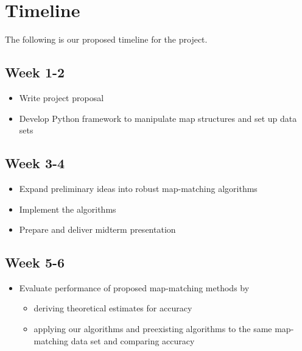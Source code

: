 \documentclass{article}
\numberwithin{equation}{section}
\theoremstyle{definition}
\begin{document}
\section{Timeline}
The following is our proposed timeline for the project. 

\subsection*{Week 1-2}
\begin{itemize}[noitemsep]
    \item Write project proposal
    \item Develop Python framework to manipulate map structures and set up data sets
\end{itemize}


\subsection*{Week 3-4}
\begin{itemize}[noitemsep]
    \item Expand preliminary ideas into robust map-matching algorithms
    \item Implement the algorithms
     \item Prepare and deliver midterm presentation
\end{itemize}


\subsection*{Week 5-6}
\begin{itemize}[noitemsep]
    \item Evaluate performance of proposed map-matching methods by
    \begin{itemize}
        \item deriving theoretical estimates for accuracy
        \item applying our algorithms and preexisting algorithms to the same map-matching data set and comparing accuracy 
    \end{itemize}
    
\end{itemize}
\end{document}
